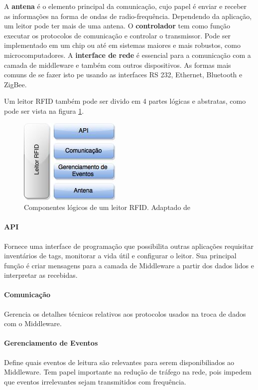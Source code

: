 \documentclass[a4paper,12pt,titlepage]{article}
\begin{document}
	A \textbf{antena} é o elemento principal da comunicação, cujo papel é enviar e receber as informações na forma de ondas de radio-frequência. Dependendo da aplicação, um leitor pode ter mais de uma antena. O \textbf{controlador} tem como função executar os protocolos de comunicação e controlar o transmissor. Pode ser implementado em um chip ou até em sistemas maiores e mais robustos, como microcomputadores. A \textbf{interface de rede} é essencial para a comunicação com a camada de middleware e também com outros dispositivos. As formas mais comuns de se fazer isto pe usando as interfaces RS 232, Ethernet, Bluetooth e ZigBee.
	
	Um leitor RFID também pode ser divido em 4 partes lógicas e abstratas, como pode ser vista na figura \ref{fig:reader}. 
		
		\begin{figure}[h!]
			\centering
			\includegraphics[width=0.25\linewidth]{reader}
			\caption{Componentes lógicos de um leitor RFID. Adaptado de \cite{rfidbook}}
			\label{fig:reader}
		\end{figure}
	
	\paragraph{API} Fornece uma interface de programação que possibilita outras aplicações requisitar inventários de tags, monitorar a vida útil e configurar o leitor. Sua principal função é criar mensagens para a camada de Middleware a partir dos dados lidos e interpretar as recebidas.
	
	\paragraph{Comunicação} Gerencia os detalhes técnicos relativos aos protocolos usados na troca de dados com o Middleware.
	
	\paragraph{Gerenciamento de Eventos} Define quais eventos de leitura são relevantes para serem disponibiliados ao Middleware. Tem papel importante na redução de tráfego na rede, pois impedem que eventos irrelevantes sejam transmitidos com frequência.
	
\end{document}
